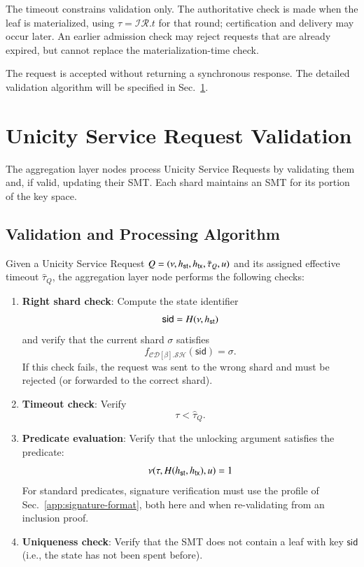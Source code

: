 The timeout constrains validation only. The authoritative check is made when the leaf is materialized, using $\tau=\mathcal{IR}.t$ for that round; certification and delivery may occur later. An earlier admission check may reject requests that are already expired, but cannot replace the materialization-time check.

The request is accepted without returning a synchronous response. The detailed validation algorithm will be specified in Sec.~\ref{sec:request-validation}.

\section{Unicity Service Request Validation}\label{sec:request-validation}

The aggregation layer nodes process Unicity Service Requests by validating them and, if valid, updating their SMT. Each shard maintains an SMT for its portion of the key space.

\subsection{Validation and Processing Algorithm}

Given a Unicity Service Request $Q = (\nu, {h_\mathsf{st}}, {h_\mathsf{tx}}, \bar\tau_Q, u)$ and its assigned effective timeout $\widehat\tau_Q$, the aggregation layer node performs the following checks:

\begin{enumerate}
	\item \textbf{Right shard check}: Compute the state identifier
	\[
	\mathsf{sid} = H(\nu, {h_\mathsf{st}})
	\]
	and verify that the current shard $\sigma$ satisfies
	\[
	f_{\mathcal{CD}[\beta].\mathcal{SH}}(\mathsf{sid}) = \sigma .
	\]
	If this check fails, the request was sent to the wrong shard and must be rejected (or forwarded to the correct shard).

	\item \textbf{Timeout check}: Verify
	\[
	\tau < \widehat\tau_Q .
	\]

	\item \textbf{Predicate evaluation}: Verify that the unlocking argument satisfies the predicate:
	\[
	\nu(\tau, H({h_\mathsf{st}}, {h_\mathsf{tx}}), u) = 1
	\]
	For standard predicates, signature verification must use the profile of Sec.~\ref{app:signature-format}, both here and when re-validating from an inclusion proof.

	\item \textbf{Uniqueness check}: Verify that the SMT does not contain a leaf with key $\mathsf{sid}$ (i.e., the state has not been spent before).
\end{enumerate}

